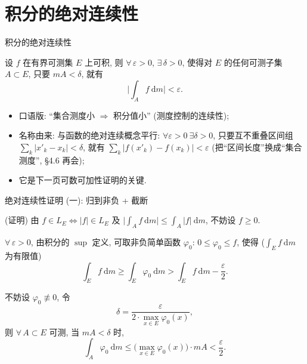 
\section[绝对连续]{积分的绝对连续性}


\begin{frame}{积分的绝对连续性}

\begin{thm}[绝对连续性]
设 $f$ 在\alert{有界}可测集 $E$ 上可积, 则 $\forall\, \varepsilon > 0$, $\exists\, \delta > 0$,
使得对 $E$ 的任何可测子集 $A \subset E$, 只要 $mA < \delta$, 就有
\[
\Big| \int_A f ~ \mathrm{d} m \Big| < \varepsilon .
\]
\end{thm}

\pause

\begin{itemize}
\item 口语版: ``集合测度小 $\Rightarrow$ 积分值小'' (测度控制的连续性);
\graymode
\item 名称由来: 与函数的\alert{绝对连续}概念平行:
$\forall \varepsilon > 0\ \exists \delta > 0$, 只要互不重叠区间组 $\sum_k |x'_k - x_k| < \delta$,
就有 $\sum_k |f(x'_k) - f(x_k)| < \varepsilon$ (把``区间长度''换成``集合测度'', \S 4.6 再会);
\normalmode
\item 它是下一页\alert{可数可加性}证明的关键.
\end{itemize}

\end{frame}


\begin{frame}{绝对连续性证明 (一): 归到非负 + 截断}

\startproof[bg=yellow, fg=red](证明)
由 $f \in L_E \iff |f| \in L_E$ 及 $\big|\int_A f ~ \mathrm{d} m\big| \leqslant \int_A |f| ~ \mathrm{d} m$,
不妨设 $f \geqslant 0$.

\pause

$\forall\, \varepsilon > 0$, 由积分的 $\sup$ 定义, 可取非负简单函数 $\varphi_0$:
$0 \leqslant \varphi_0 \leqslant f$, 使得 ($\int_E f ~ \mathrm{d} m$ 为有限值)
\[
\int_E f ~ \mathrm{d} m \geqslant \int_E \varphi_0 ~ \mathrm{d} m > \int_E f ~ \mathrm{d} m - \frac{\varepsilon}{2} .
\]

\pause

不妨设 $\varphi_0 \not\equiv 0$, 令
\[
\delta = \frac{\varepsilon}{2 \cdot \max_{x \in E} \varphi_0(x)} ,
\]
则 $\forall\, A \subset E$ 可测, 当 $mA < \delta$ 时,
\[
\int_A \varphi_0 ~ \mathrm{d} m \leqslant \Big( \max_{x \in E} \varphi_0(x) \Big) \cdot mA < \frac{\varepsilon}{2} .
\]

\end{frame}

